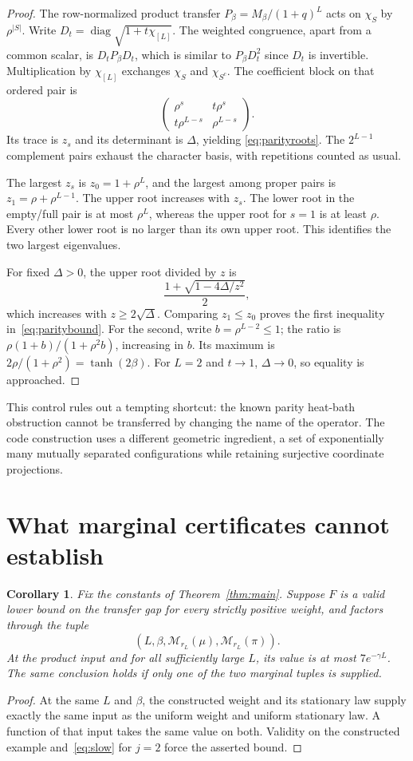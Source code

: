 \documentclass[11pt]{article}
\newtheorem{corollary}[theorem]{Corollary}
\newcommand{\diag}{\operatorname{diag}}
\begin{document}
\begin{proof}
The row-normalized product transfer $P_\beta=M_\beta/(1+q)^L$ acts on
$\chi_S$ by $\rho^{|S|}$. Write $D_t=\diag\sqrt{1+t\chi_{[L]}}$.
The weighted congruence, apart from a common scalar, is $D_tP_\beta D_t$,
which is similar to $P_\beta D_t^2$ since $D_t$ is invertible.
Multiplication by $\chi_{[L]}$ exchanges $\chi_S$ and $\chi_{S^c}$.
The coefficient block on that ordered pair is
\[
 \begin{pmatrix}
 \rho^s&t\rho^s\\ t\rho^{L-s}&\rho^{L-s}
 \end{pmatrix}.
\]
Its trace is $z_s$ and its determinant is $\Delta$, yielding
\eqref{eq:parityroots}. The $2^{L-1}$ complement pairs exhaust the
character basis, with repetitions counted as usual.

The largest $z_s$ is $z_0=1+\rho^L$, and the largest among proper pairs
is $z_1=\rho+\rho^{L-1}$. The upper root increases with $z_s$.
The lower root in the empty/full pair is at most $\rho^L$, whereas
the upper root for $s=1$ is at least $\rho$. Every other lower root
is no larger than its own upper root. This identifies the two largest
eigenvalues.

For fixed $\Delta>0$, the upper root divided by $z$ is
\[
 \frac{1+\sqrt{1-4\Delta/z^2}}2,
\]
which increases with $z\ge2\sqrt\Delta$. Comparing $z_1\le z_0$ proves
the first inequality in~\eqref{eq:paritybound}. For the second, write
$b=\rho^{L-2}\le1$; the ratio is $\rho(1+b)/(1+\rho^2b)$, increasing
in $b$. Its maximum is $2\rho/(1+\rho^2)=\tanh(2\beta)$.
For $L=2$ and $t\to1$, $\Delta\to0$, so equality is approached.
\end{proof}

This control rules out a tempting shortcut: the known parity heat-bath
obstruction cannot be transferred by changing the name of the operator.
The code construction uses a different geometric ingredient, a set of
exponentially many mutually separated configurations while retaining
surjective coordinate projections.

\section{What marginal certificates cannot establish}
\begin{corollary}\label{cor:certificate}
Fix the constants of Theorem~\ref{thm:main}. Suppose $F$ is a valid lower
bound on the transfer gap for every strictly positive weight, and factors
through the tuple
\[
 (L,\beta,\mathcal M_{r_L}(\mu),\mathcal M_{r_L}(\pi)).
\]
At the product input and for all sufficiently large $L$, its value is at
most $7e^{-\gamma L}$. The same conclusion holds if only one of the two
marginal tuples is supplied.
\end{corollary}
\begin{proof}
At the same $L$ and $\beta$, the constructed weight and its stationary
law supply exactly the same input as the uniform weight and uniform
stationary law. A function of that input takes the same value on both.
Validity on the constructed example and~\eqref{eq:slow} for $j=2$
force the asserted bound.
\end{proof}
\end{document}
